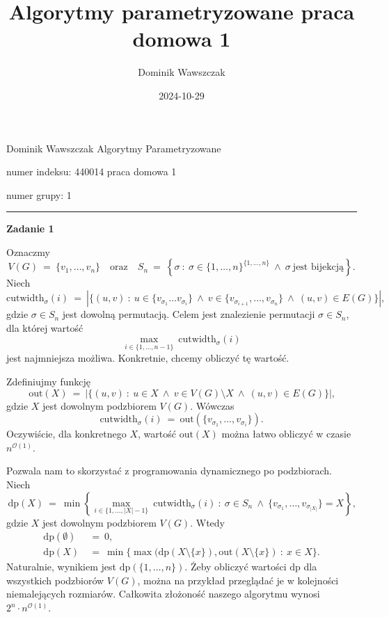 \documentclass[12pt]{article}
\title{Algorytmy parametryzowane praca domowa 1}
\author{Dominik Wawszczak}
\date{2024-10-29}
\begin{document}
	\setlength{\parindent}{0 cm}
	
	Dominik Wawszczak \hfill Algorytmy Parametryzowane
	
	numer indeksu: 440014 \hfill praca domowa 1
	
	numer grupy: 1
	
	\bigskip
	\hrule
	\bigskip
	
	\textbf{Zadanie 1}
	
	\medskip
	
	Oznaczmy
	\[ V(G) \ = \ \{v_{1}, \ldots, v_{n}\} \quad \text{oraz} \quad S_{n} \ = \
	\left\{ \sigma \ : \ \sigma \in \{1, \ldots, n\}^{\{1, \ldots, n\}} \ \wedge
	\ \sigma \ \text{jest bijekcją} \right\} \text{.} \]
	Niech
	\[ \text{cutwidth}_{\sigma}(i) \ = \ |\{(u, v) \ : \ u \in \{v_{\sigma_{1}}
	\ldots v_{\sigma_{i}}\} \ \wedge \ v \in \{v_{\sigma_{i + 1}}, \ldots,
	v_{\sigma_{n}}\} \ \wedge \ (u, v) \in E(G)\}| \text{,} \]
	gdzie \(\sigma \in S_{n}\) jest dowolną permutacją. Celem jest znalezienie
	permutacji \(\sigma \in S_{n}\), dla której wartość
	\[ \underset{i \in \{1, \ldots, n - 1\}}{\max} \
	\text{cutwidth}_{\sigma}(i) \]
	jest najmniejsza możliwa. Konkretnie, chcemy obliczyć tę wartość.
	
	\medskip
	
	Zdefiniujmy funkcję
	\[ \text{out}(X) \ = \ |\{(u, v) \ : \ u \in X \ \wedge \ v \in V(G)
	\setminus X \ \wedge \ (u, v) \in E(G)\}| \text{,} \]
	gdzie \(X\) jest dowolnym podzbiorem \(V(G)\). Wówczas
	\[ \text{cutwidth}_{\sigma}(i) \ = \ \text{out}(\{v_{\sigma_{1}}, \ldots,
	v_{\sigma_{i}}\}) \text{.} \]
	Oczywiście, dla konkretnego \(X\), wartość \(\text{out}(X)\) można łatwo
	obliczyć w czasie \(n^{\mathcal{O}(1)}\).
	
	\medskip
	
	Pozwala nam to skorzystać z programowania dynamicznego po podzbiorach. Niech
	\[ \text{dp}(X) \ = \ \min \left\{ \underset{i \in
	\{1, \ldots, |X| - 1\}}{\max} \ \text{cutwidth}_{\sigma}(i) \ : \ \sigma \in
	S_{n} \ \wedge \ \{v_{\sigma_{1}}, \ldots, v_{\sigma_{|X|}}\} = X \right\}
	\text{,} \]
	gdzie \(X\) jest dowolnym podzbiorem \(V(G)\). Wtedy
	\begin{align*}
		\text{dp}(\emptyset) \ &= \ 0 \text{,} \\
		\text{dp}(X) \ &= \ \min \{\max(\text{dp}(X \setminus \{x\}),
		\text{out}(X \setminus \{x\}) \ : \ x \in X\} \text{.}
	\end{align*}
	Naturalnie, wynikiem jest \(\text{dp}(\{1, \ldots, n\})\). Żeby obliczyć
	wartości \(\text{dp}\) dla wszystkich podzbiorów \(V(G)\), można na przykład
	przeglądać je w kolejności niemalejących rozmiarów. Całkowita złożoność
	naszego algorytmu wynosi \(2^{n} \cdot n^{\mathcal{O}(1)}\).
\end{document}
